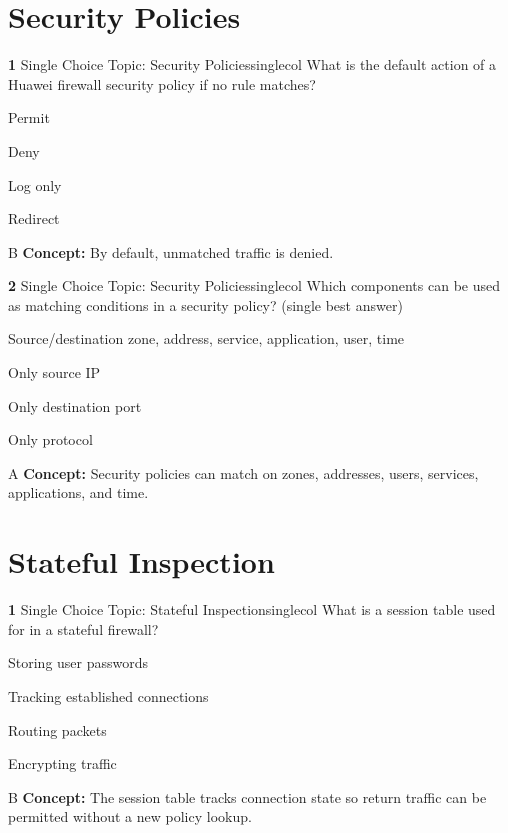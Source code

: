 \documentclass[10pt,a4paper]{article}
\begin{document}
\section{Security Policies}
\begin{qcard}{\color{white}\textbf{1} \hfill \small Single Choice \textbar{} Topic: Security Policies}{singlecol}
What is the default action of a Huawei firewall security policy if no rule matches?

\begin{qoptions}
\item Permit
\item Deny
\item Log only
\item Redirect
\end{qoptions}
\begin{explainbox}{B}
\textbf{Concept:} By default, unmatched traffic is denied.
\end{explainbox}
\end{qcard}

\begin{qcard}{\color{white}\textbf{2} \hfill \small Single Choice \textbar{} Topic: Security Policies}{singlecol}
Which components can be used as matching conditions in a security policy? (single best answer)

\begin{qoptions}
\item Source/destination zone, address, service, application, user, time
\item Only source IP
\item Only destination port
\item Only protocol
\end{qoptions}
\begin{explainbox}{A}
\textbf{Concept:} Security policies can match on zones, addresses, users, services, applications, and time.
\end{explainbox}
\end{qcard}

\section{Stateful Inspection}
\begin{qcard}{\color{white}\textbf{1} \hfill \small Single Choice \textbar{} Topic: Stateful Inspection}{singlecol}
What is a session table used for in a stateful firewall?

\begin{qoptions}
\item Storing user passwords
\item Tracking established connections
\item Routing packets
\item Encrypting traffic
\end{qoptions}
\begin{explainbox}{B}
\textbf{Concept:} The session table tracks connection state so return traffic can be permitted without a new policy lookup.
\end{explainbox}
\end{qcard}
\end{document}
